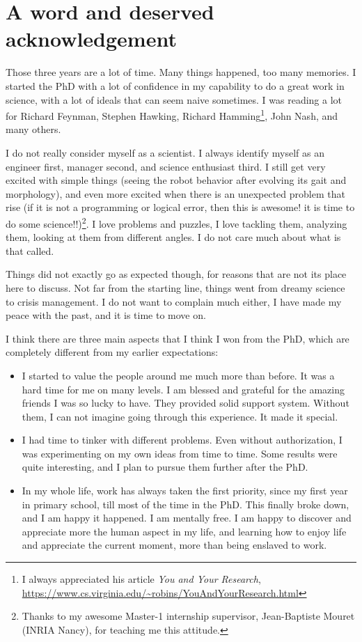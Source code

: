 \chapter*{A word and deserved acknowledgement}

\par Those three years are a lot of time. Many things happened, too many memories. I started the PhD with a lot of confidence in my capability to do a great work in science, with a lot of ideals that can seem naive sometimes. I was reading a lot for Richard Feynman, Stephen Hawking, Richard Hamming\footnote{I always appreciated his article \textit{You and Your Research}, \url{https://www.cs.virginia.edu/~robins/YouAndYourResearch.html}}, John Nash, and many others.

\par I do not really consider myself as a scientist. I always identify myself as an engineer first, manager second, and science enthusiast third. I still get very excited with simple things (seeing the robot behavior after evolving its gait and morphology), and even more excited when there is an unexpected problem that rise (if it is not a programming or logical error, then this is awesome! it is time to do some science!!)\footnote{Thanks to my awesome Master-1 internship supervisor, Jean-Baptiste Mouret (INRIA Nancy), for teaching me this attitude.}. I love problems and puzzles, I love tackling them, analyzing them, looking at them from different angles. I do not care much about what is that called.

\par Things did not exactly go as expected though, for reasons that are not its place here to discuss. Not far from the starting line, things went from dreamy science to crisis management. I do not want to complain much either, I have made my peace with the past, and it is time to move on.

\par I think there are three main aspects that I think I won from the PhD, which are completely different from my earlier expectations:
\begin{itemize}
  \item I started to value the people around me much more than before. It was a hard time for me on many levels. I am blessed and grateful for the amazing friends I was so lucky to have. They provided solid support system. Without them, I can not imagine going through this experience. It made it special.
  \item I had time to tinker with different problems. Even without authorization, I was experimenting on my own ideas from time to time. Some results were quite interesting, and I plan to pursue them further after the PhD.
  \item In my whole life, work has always taken the first priority, since my first year in primary school, till most of the time in the PhD. This finally broke down, and I am happy it happened. I am mentally free. I am happy to discover and appreciate more the human aspect in my life, and learning how to enjoy life and appreciate the current moment, more than being enslaved to work.
\end{itemize}

